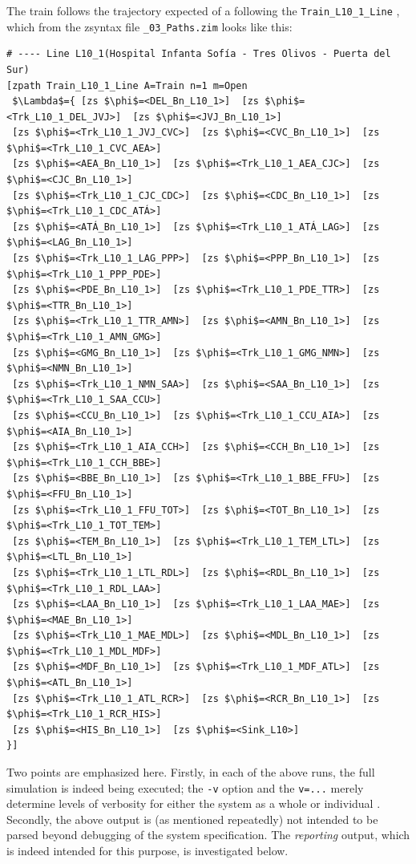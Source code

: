 The train follows the trajectory expected of a  following the
{\tt Train\_L10\_1\_Line} , which from the zsyntax file {\tt \_03\_Paths.zim}
looks like this:
\begin{lstlisting}[mathescape]
# ---- Line L10_1(Hospital Infanta Sofía - Tres Olivos - Puerta del Sur)
[zpath Train_L10_1_Line A=Train n=1 m=Open
 $\Lambda$={ [zs $\phi$=<DEL_Bn_L10_1>]  [zs $\phi$=<Trk_L10_1_DEL_JVJ>]  [zs $\phi$=<JVJ_Bn_L10_1>]
 [zs $\phi$=<Trk_L10_1_JVJ_CVC>]  [zs $\phi$=<CVC_Bn_L10_1>]  [zs $\phi$=<Trk_L10_1_CVC_AEA>]
 [zs $\phi$=<AEA_Bn_L10_1>]  [zs $\phi$=<Trk_L10_1_AEA_CJC>]  [zs $\phi$=<CJC_Bn_L10_1>]
 [zs $\phi$=<Trk_L10_1_CJC_CDC>]  [zs $\phi$=<CDC_Bn_L10_1>]  [zs $\phi$=<Trk_L10_1_CDC_ATÁ>]
 [zs $\phi$=<ATÁ_Bn_L10_1>]  [zs $\phi$=<Trk_L10_1_ATÁ_LAG>]  [zs $\phi$=<LAG_Bn_L10_1>]
 [zs $\phi$=<Trk_L10_1_LAG_PPP>]  [zs $\phi$=<PPP_Bn_L10_1>]  [zs $\phi$=<Trk_L10_1_PPP_PDE>]
 [zs $\phi$=<PDE_Bn_L10_1>]  [zs $\phi$=<Trk_L10_1_PDE_TTR>]  [zs $\phi$=<TTR_Bn_L10_1>]
 [zs $\phi$=<Trk_L10_1_TTR_AMN>]  [zs $\phi$=<AMN_Bn_L10_1>]  [zs $\phi$=<Trk_L10_1_AMN_GMG>]
 [zs $\phi$=<GMG_Bn_L10_1>]  [zs $\phi$=<Trk_L10_1_GMG_NMN>]  [zs $\phi$=<NMN_Bn_L10_1>]
 [zs $\phi$=<Trk_L10_1_NMN_SAA>]  [zs $\phi$=<SAA_Bn_L10_1>]  [zs $\phi$=<Trk_L10_1_SAA_CCU>]
 [zs $\phi$=<CCU_Bn_L10_1>]  [zs $\phi$=<Trk_L10_1_CCU_AIA>]  [zs $\phi$=<AIA_Bn_L10_1>]
 [zs $\phi$=<Trk_L10_1_AIA_CCH>]  [zs $\phi$=<CCH_Bn_L10_1>]  [zs $\phi$=<Trk_L10_1_CCH_BBE>]
 [zs $\phi$=<BBE_Bn_L10_1>]  [zs $\phi$=<Trk_L10_1_BBE_FFU>]  [zs $\phi$=<FFU_Bn_L10_1>]
 [zs $\phi$=<Trk_L10_1_FFU_TOT>]  [zs $\phi$=<TOT_Bn_L10_1>]  [zs $\phi$=<Trk_L10_1_TOT_TEM>]
 [zs $\phi$=<TEM_Bn_L10_1>]  [zs $\phi$=<Trk_L10_1_TEM_LTL>]  [zs $\phi$=<LTL_Bn_L10_1>]
 [zs $\phi$=<Trk_L10_1_LTL_RDL>]  [zs $\phi$=<RDL_Bn_L10_1>]  [zs $\phi$=<Trk_L10_1_RDL_LAA>]
 [zs $\phi$=<LAA_Bn_L10_1>]  [zs $\phi$=<Trk_L10_1_LAA_MAE>]  [zs $\phi$=<MAE_Bn_L10_1>]
 [zs $\phi$=<Trk_L10_1_MAE_MDL>]  [zs $\phi$=<MDL_Bn_L10_1>]  [zs $\phi$=<Trk_L10_1_MDL_MDF>]
 [zs $\phi$=<MDF_Bn_L10_1>]  [zs $\phi$=<Trk_L10_1_MDF_ATL>]  [zs $\phi$=<ATL_Bn_L10_1>]
 [zs $\phi$=<Trk_L10_1_ATL_RCR>]  [zs $\phi$=<RCR_Bn_L10_1>]  [zs $\phi$=<Trk_L10_1_RCR_HIS>]
 [zs $\phi$=<HIS_Bn_L10_1>]  [zs $\phi$=<Sink_L10>]
}]
\end{lstlisting}

Two points are emphasized here. Firstly, in each of the above runs, the full simulation is indeed
being executed; the {\tt -v} option and the {\tt v=...} merely determine
levels of verbosity for either the system as a whole or individual .
Secondly, the above output is (as mentioned repeatedly) not intended
to be parsed beyond debugging of the system specification.
The \emph{reporting} output, which is indeed intended for this purpose,
is investigated below.

